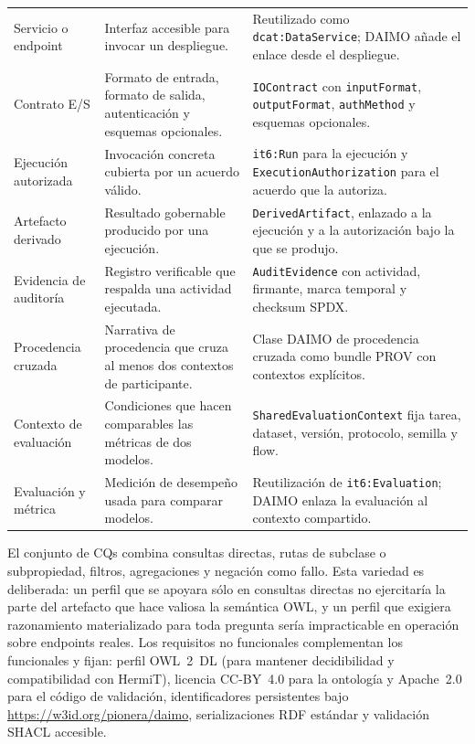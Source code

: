 \documentclass[Afour,sagev,times]{sagej}
\newcommand{\code}[1]{\texttt{#1}}
\begin{document}
\begin{table}[tb]
\begin{tabular}{@{}p{2.8cm}p{4.9cm}p{6.8cm}@{}}
Servicio o endpoint & Interfaz accesible para invocar un despliegue. & Reutilizado como \code{dcat:DataService}; DAIMO añade el enlace desde el despliegue. \\
Contrato E/S & Formato de entrada, formato de salida, autenticación y esquemas opcionales. & \code{IOContract} con \code{inputFormat}, \code{outputFormat}, \code{authMethod} y esquemas opcionales. \\
Ejecución autorizada & Invocación concreta cubierta por un acuerdo válido. & \code{it6:Run} para la ejecución y \code{ExecutionAuthorization} para el acuerdo que la autoriza. \\
Artefacto derivado & Resultado gobernable producido por una ejecución. & \code{DerivedArtifact}, enlazado a la ejecución y a la autorización bajo la que se produjo. \\
Evidencia de auditoría & Registro verificable que respalda una actividad ejecutada. & \code{AuditEvidence} con actividad, firmante, marca temporal y checksum SPDX. \\
Procedencia cruzada & Narrativa de procedencia que cruza al menos dos contextos de participante. & Clase DAIMO de procedencia cruzada como bundle PROV con contextos explícitos. \\
Contexto de evaluación & Condiciones que hacen comparables las métricas de dos modelos. & \code{SharedEvaluationContext} fija tarea, dataset, versión, protocolo, semilla y flow. \\
Evaluación y métrica & Medición de desempeño usada para comparar modelos. & Reutilización de \code{it6:Evaluation}; DAIMO enlaza la evaluación al contexto compartido. \\
\bottomrule
\end{tabular}
\end{table}

El conjunto de CQs combina consultas directas, rutas de subclase o subpropiedad, filtros, agregaciones y negación como fallo. Esta variedad es deliberada: un perfil que se apoyara sólo en consultas directas no ejercitaría la parte del artefacto que hace valiosa la semántica OWL, y un perfil que exigiera razonamiento materializado para toda pregunta sería impracticable en operación sobre endpoints reales. Los requisitos no funcionales complementan los funcionales y fijan: perfil OWL~2~DL (para mantener decidibilidad y compatibilidad con HermiT), licencia CC-BY~4.0 para la ontología y Apache~2.0 para el código de validación, identificadores persistentes bajo \url{https://w3id.org/pionera/daimo}, serializaciones RDF estándar y validación SHACL accesible.
\end{document}
